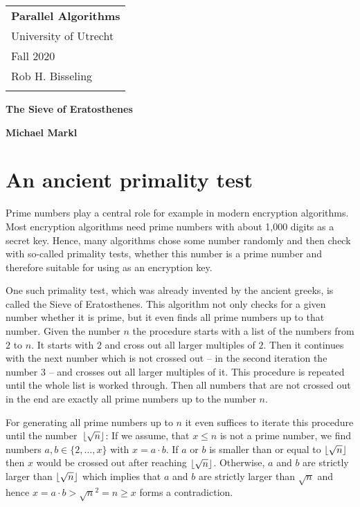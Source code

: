 \documentclass[a4paper,12pt]{article}
\DeclarePairedDelimiter\floor{\lfloor}{\rfloor}
\begin{document}
\thispagestyle{empty}

\begin{tabular}{p{15.5cm}} %
{\large \bf Parallel Algorithms} \\
University of Utrecht \\ Fall 2020  \\ Rob H. Bisseling\\
\hline
\\
\end{tabular}

\vspace*{0.3cm}
\begin{center}
	{\Large \bf The Sieve of Eratosthenes}
	\vspace{2mm}
	
	{\bf Michael Markl}
\end{center}  
\vspace{0.4cm}

\section{An ancient primality test}

Prime numbers play a central role for example in modern encryption algorithms.
Most encryption algorithms need prime numbers with about 1,000 digits as a secret key.
Hence, many algorithms chose some number randomly and then check with so-called primality tests, whether this number is a prime number and therefore suitable for using as an encryption key.

One such primality test, which was already invented by the ancient greeks, is called the Sieve of Eratosthenes.
This algorithm not only checks for a given number whether it is prime, but it even finds all prime numbers up to that number.
Given the number $n$ the procedure starts with a list of the numbers from $2$ to $n$.
It starts with $2$ and cross out all larger multiples of $2$.
Then it continues with the next number which is not crossed out -- in the second iteration the number $3$ -- and crosses out all larger multiples of it.
This procedure is repeated until the whole list is worked through.
Then all numbers that are not crossed out in the end are exactly all prime numbers up to the number $n$.

For generating all prime numbers up to $n$ it even suffices to iterate this procedure until the number~$\floor{\sqrt{n}}$: If we assume, that $x\leq n$ is not a prime number, we find numbers $a,b\in\{2, \dots, x\}$ with $x=a\cdot b$.
If $a$ or $b$ is smaller than or equal to $\floor{\sqrt{n}}$ then $x$ would be crossed out after reaching $\floor{\sqrt{n}}$.
Otherwise, $a$ and $b$ are strictly larger than $\floor{\sqrt{n}}$ which implies that $a$ and $b$ are strictly larger than $\sqrt{n}$ and hence $x = a\cdot b > \sqrt{n}^2 = n \geq x$ forms a contradiction.
\end{document}
